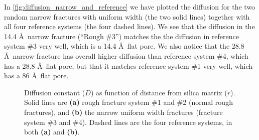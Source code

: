 
In \cref{fig:diffusion_narrow_and_reference} we have plotted the diffusion for the two random narrow fractures with uniform width (the two solid lines) together with all four reference systems (the four dashed lines). We see that the diffusion in the 14.4 \AA\ narrow fracture (``Rough \#3'') matches the the diffusion in reference system \#3 very well, which is a 14.4 \AA\ flat pore. We also notice that the 28.8 \AA\ narrow fracture has overall higher diffusion than reference system \#4, which has a 28.8 \AA\ flat pore, but that it matches reference system \#1 very well, which has a 86 \AA\ flat pore.
%
\begin{figure}[!htb]%
\setlength{\myfigwidth}{0.58\textwidth}%
\makebox[\textwidth][c]{ %
    \begin{minipage}[t]{\myfigwidth}%
        \centering%
        \subcaption{\label{fig:diffusion_normal_and_reference}}%
    \end{minipage}%
    \hfill%
    \begin{minipage}[t]{\myfigwidth}%
        \centering%
        \subcaption{\label{fig:diffusion_narrow_and_reference}}%
    \end{minipage}%
}%
\caption{%
    Diffusion constant ($D$) as function of distance from silica matrix ($r$). Solid lines are \textbf{(a)} rough fracture system \#1 and \#2 (normal rough fractures), and \textbf{(b)} the narrow uniform width fractures (fracture system \#3 and \#4). Dashed lines are the four reference systems, in both \textbf{(a)} and \textbf{(b)}.%
    \label{fig:last_diffusion_figure}%
}%
\end{figure}%